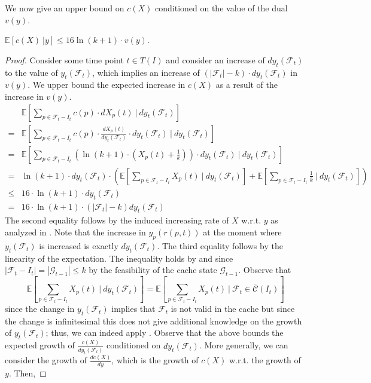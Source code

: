 \documentclass[11pt]{article}
\newcommand{\cG}{{\mathcal{G}}}
\newcommand{\cF}{{\mathcal{F}}}
\newcommand{\cC}{{\mathcal{C}}}
\newcommand{\E}{{\mathbb{E}}}
\newcommand{\bbc}{{\bar{\cC}(I_t)}}
\begin{document}
{We now give an upper bound on $c(X)$ conditioned on the value of the dual $v(y)$.  

	\begin{lemma}
	\label{lem:c(X)}
	$\E \left[ c(X) ~\big| y \right] \leq 16 \ln (k+1) \cdot v(y)$. 
\end{lemma}

\begin{proof}
	Consider some time point $t \in T(I)$ and consider an increase of $d y_t(\cF_t)$ to the value of $y_t(\cF_t)$, which implies an increase of $(|\cF_t|-k) \cdot d y_t(\cF_t)$ in $v(y)$. We upper bound the expected increase in $c(X)$ as a result of the increase in $v(y)$. 
	\begin{equation}
		\label{eq:IncX}
		\begin{aligned}
	{} &	\E \left[ \sum_{p \in \cF_t-I_t} c(p) \cdot d X_p(t)~\bigg|~d y_t(\cF_t) \right] \\
		={} & 	\E \left[ \sum_{p \in \cF_t-I_t} c(p) \cdot \frac{d X_p(t)}{d y_t(\cF_t)} \cdot d y_t(\cF_t) ~\bigg|~d y_t(\cF_t) \right] \\
		={} &  \E \left[ \sum_{p \in \cF_t-I_t} \left( \ln (k+1) \cdot \left( X_p(t)+\frac{1}{k}\right)\right) \cdot d y_t(\cF_t) ~\bigg|~d y_t(\cF_t)\right]\\
		={} &  \ln (k+1) \cdot d y_t(\cF_t) \cdot \left( \E \left[ \sum_{p \in \cF_t-I_t} X_p(t)  ~\bigg|~d y_t(\cF_t) \right] + \E \left[\sum_{p \in \cF_t-I_t} \frac{1}{k} ~\bigg|~d y_t(\cF_t) \right]\right)\\
		\leq {} &   16 \cdot \ln (k+1) \cdot d y_t(\cF_t) \\
		= {} &  16 \cdot \ln (k+1) \cdot \left( |\cF_t|-k \right)d y_t(\cF_t)
		\end{aligned}
	\end{equation} The second equality follows by the induced increasing rate of $X$ w.r.t. $y$ as analyzed in \cite{bansal2012randomized}. Note that the increase in $y_p(r(p,t))$ at the moment where $y_t(\cF_t)$ is increased is exactly $d y_t(\cF_t)$. The third equality follows by the linearity of the expectation. The inequality holds by  and since $|\cF_t-I_t| = |\cG_{t-1}| \leq k$ by the feasibility of the cache state $\cG_{t-1}$. Observe that $$\E \left[ \sum_{p \in \cF_t-I_t} X_p(t)  ~\bigg|~d y_t(\cF_t) \right] = \E \left[ \sum_{p \in \cF_t-I_t} X_p(t)  ~\bigg|~\cF_t \in \bbc \right]$$ since the change in $y_t(\cF_t)$ implies that $\cF_t$ is not valid in the cache but since the change is infinitesimal this does not give additional knowledge on the growth of $y_t(\cF_t)$; thus, we can indeed apply . Observe that the above bounds the expected growth of $ \frac{c(X)}{d y_t(\cF_t)}$ conditioned on $d y_t(\cF_t)$. More generally, we can consider the growth of $ \frac{d c(X)}{d y}$, which is the growth of $c(X)$ w.r.t. the growth of $y$. Then, 
	

\end{proof}}
\end{document}
